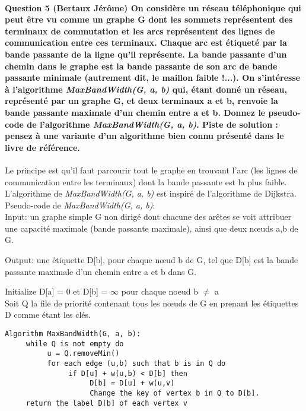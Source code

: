 \documentclass[a4paper]{article}
\begin{document}
\paragraph{Question 5 (Bertaux Jérôme) On considère un réseau téléphonique qui peut être vu comme un graphe G dont les sommets représentent des terminaux de commutation et les arcs représentent des lignes de communication entre ces terminaux. Chaque arc est étiqueté par la bande passante de la ligne qu’il représente. La bande passante d’un chemin dans le graphe est la bande passante de son arc de bande passante minimale (autrement dit, le maillon faible !...). On s'intéresse à l’algorithme \textit{MaxBandWidth(G, a, b)} qui, étant donné un réseau, représenté par un graphe G, et deux terminaux a et b, renvoie la bande passante maximale d’un chemin entre a et b. Donnez le pseudo- code de l’algorithme \textit{MaxBandWidth(G, a, b)}. Piste de solution : pensez à une variante d’un algorithme bien connu présenté dans le livre de référence.}

Le principe est qu'il faut parcourir tout le graphe en trouvant l'arc (les lignes de communication entre les terminaux) dont la bande passante est la plus faible. L'algorithme de \textit{MaxBandWidth(G, a, b)} est inspiré de l'algorithme de Dijkstra.\\

Pseudo-code de \textit{MaxBandWidth(G, a, b)}:\\
     Input: un graphe simple G non dirigé dont chacune des arêtes se voit attribuer une capacité maximale (bande passante maximale), ainsi que deux nœuds a,b de G.
	 
     Output: une étiquette D[b], pour chaque nœud b de G, tel que D[b] est la bande passante maximale d’un chemin entre a et b dans G.
      
      Initialize D[a] = 0 et D[b] =  $\infty$ pour chaque noeud b $\neq$ a\\
      Soit Q la file de priorité contenant tous les nœuds de G en prenant les étiquettes D comme étant les clés.
\begin{verbatim}
Algorithm MaxBandWidth(G, a, b):
     while Q is not empty do
          u = Q.removeMin()
          for each edge (u,b) such that b is in Q do
               if D[u] + w(u,b) < D[b] then
                    D[b] = D[u] + w(u,v)
                    Change the key of vertex b in Q to D[b].
     return the label D[b] of each vertex v
\end{verbatim}
\end{document}
